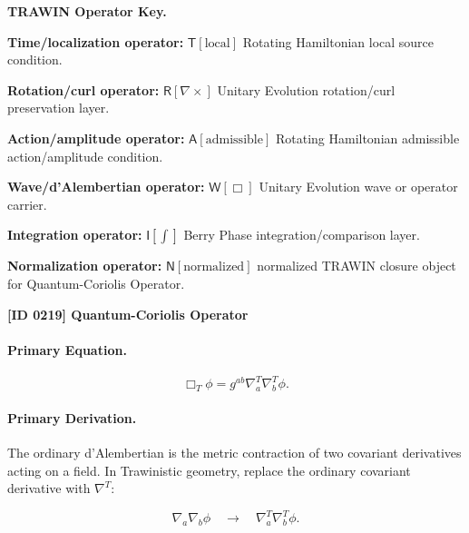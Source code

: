 \par\vspace{0.45\baselineskip}
\noindent\begin{minipage}[t]{\linewidth}
\begingroup
\small
\raggedright
\textbf{TRAWIN Operator Key.}\par
\noindent\textbf{Time/localization operator:} $\mathsf{T}\!\left[\mathrm{local}\right]$ Rotating Hamiltonian local source condition.\par
\noindent\textbf{Rotation/curl operator:} $\mathsf{R}\!\left[\nabla\times\right]$ Unitary Evolution rotation/curl preservation layer.\par
\noindent\textbf{Action/amplitude operator:} $\mathsf{A}\!\left[\mathrm{admissible}\right]$ Rotating Hamiltonian admissible action/amplitude condition.\par
\noindent\textbf{Wave/d'Alembertian operator:} $\mathsf{W}\!\left[\Box\right]$ Unitary Evolution wave or operator carrier.\par
\noindent\textbf{Integration operator:} $\mathsf{I}\!\left[\int\right]$ Berry Phase integration/comparison layer.\par
\noindent\textbf{Normalization operator:} $\mathsf{N}\!\left[\mathrm{normalized}\right]$ normalized TRAWIN closure object for Quantum-Coriolis Operator.\par
\endgroup
\end{minipage}

\clearpage
\noindent\textbf{[ID 0219] Quantum-Coriolis Operator}\par
\vspace{0.35em}
\paragraph{Primary Equation.}
\begin{equation}
\Box_T\phi
=
g^{ab}
\nabla^{T}_{a}
\nabla^{T}_{b}
\phi .
\end{equation}

\paragraph{Primary Derivation.}
The ordinary d'Alembertian is the metric contraction of two covariant derivatives acting on a field.  
In Trawinistic geometry, replace the ordinary covariant derivative with $\nabla^T$:

\begin{equation}
\nabla_a\nabla_b\phi
\quad\longrightarrow\quad
\nabla^T_a\nabla^T_b\phi .
\end{equation}


